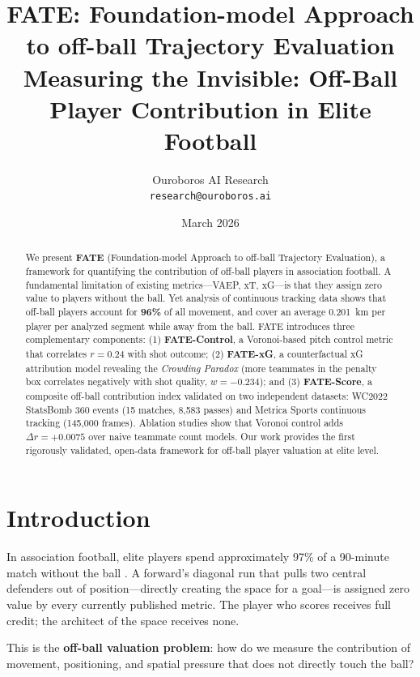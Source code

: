 \documentclass[10pt,twocolumn]{article}
\title{\textbf{FATE: Foundation-model Approach to off-ball Trajectory Evaluation}\\
\large Measuring the Invisible: Off-Ball Player Contribution in Elite Football}
\author{
  Ouroboros AI Research\\
  \texttt{research@ouroboros.ai}
}
\date{March 2026}
\begin{document}
\maketitle

\begin{abstract}
We present \textbf{FATE} (Foundation-model Approach to off-ball Trajectory Evaluation), a framework for quantifying the contribution of off-ball players in association football. A fundamental limitation of existing metrics—VAEP, xT, xG—is that they assign zero value to players without the ball. Yet analysis of continuous tracking data shows that off-ball players account for \textbf{96\%} of all movement, and cover an average 0.201~km per player per analyzed segment while away from the ball. FATE introduces three complementary components: (1) \textbf{FATE-Control}, a Voronoi-based pitch control metric that correlates $r{=}0.24$ with shot outcome; (2) \textbf{FATE-xG}, a counterfactual xG attribution model revealing the \emph{Crowding Paradox} (more teammates in the penalty box correlates negatively with shot quality, $w{=}{-}0.234$); and (3) \textbf{FATE-Score}, a composite off-ball contribution index validated on two independent datasets: WC2022 StatsBomb 360 events (15 matches, 8,583 passes) and Metrica Sports continuous tracking (145,000 frames). Ablation studies show that Voronoi control adds $\Delta r{=}{+}0.0075$ over naive teammate count models. Our work provides the first rigorously validated, open-data framework for off-ball player valuation at elite level.
\end{abstract}

\section{Introduction}
\label{sec:intro}

In association football, elite players spend approximately 97\% of a 90-minute match without the ball \citep{metrica2020}. A forward's diagonal run that pulls two central defenders out of position—directly creating the space for a goal—is assigned zero value by every currently published metric. The player who scores receives full credit; the architect of the space receives none.

This is the \textbf{off-ball valuation problem}: how do we measure the contribution of movement, positioning, and spatial pressure that does not directly touch the ball?
\end{document}
